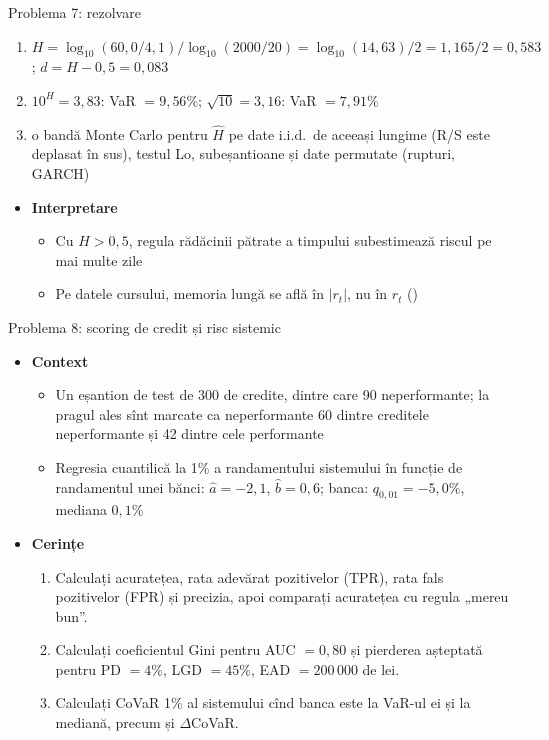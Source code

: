 \begin{frame}{Problema 7: rezolvare}
\itemsize{\footnotesize}
\begin{enumerate}
    \item $H = \log_{10}(60{,}0/4{,}1)/\log_{10}(2000/20) = \log_{10}(14{,}63)/2 = 1{,}165/2 = 0{,}583$; $d = H - 0{,}5 = 0{,}083$
    \item $10^{H} = 3{,}83$: VaR $= 9{,}56\%$; $\sqrt{10} = 3{,}16$: VaR $= 7{,}91\%$
    \item o bandă Monte Carlo pentru $\hat H$ pe date i.i.d.\ de aceeași lungime (R/S este deplasat în sus), testul Lo, subeșantioane și date permutate (rupturi, GARCH)
\end{enumerate}
\begin{itemize}
    \item \textbf{Interpretare}
    \begin{itemize}
        \item Cu $H > 0{,}5$, regula rădăcinii pătrate a timpului subestimează riscul pe mai multe zile
        \item Pe datele cursului, memoria lungă se află în $|r_t|$, nu în $r_t$ ()
    \end{itemize}
\end{itemize}
\end{frame}

\begin{frame}{Problema 8: scoring de credit și risc sistemic}
\itemsize{\footnotesize}
\begin{itemize}
    \item \textbf{Context}
    \begin{itemize}
        \item Un eșantion de test de 300 de credite, dintre care 90 neperformante; la pragul ales sînt marcate ca neperformante 60 dintre creditele neperformante și 42 dintre cele performante
        \item Regresia cuantilică la 1\% a randamentului sistemului în funcție de randamentul unei bănci: $\hat a = -2{,}1$, $\hat b = 0{,}6$; banca: $q_{0,01} = -5{,}0\%$, mediana $0{,}1\%$
    \end{itemize}
    \item \textbf{Cerințe}
\begin{enumerate}
    \item Calculați acuratețea, rata adevărat pozitivelor (TPR), rata fals pozitivelor (FPR) și precizia, apoi comparați acuratețea cu regula „mereu bun”.
    \item Calculați coeficientul Gini pentru AUC $= 0{,}80$ și pierderea așteptată pentru PD $= 4\%$, LGD $= 45\%$, EAD $= 200\,000$ de lei.
    \item Calculați CoVaR 1\% al sistemului cînd banca este la VaR-ul ei și la mediană, precum și $\Delta$CoVaR.
\end{enumerate}
\end{itemize}
\end{frame}

